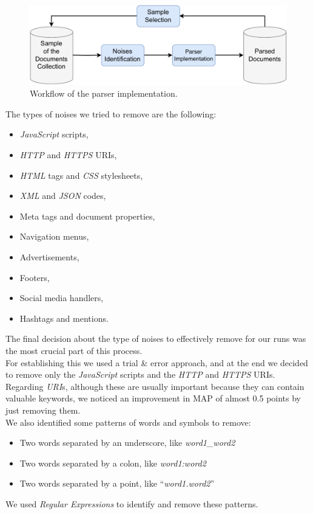 \begin{figure}[!h]
    \centering
    \includegraphics[width=0.8\linewidth]{figure/Parser_implementation_workflow.pdf}
    \caption{Workflow of the parser implementation.}
    \label{fig:Parser_implementation_workflow}
\end{figure}

The types of noises we tried to remove are the following:
\begin{itemize}
\item \textit{JavaScript} scripts,
\item \textit{HTTP} and \textit{HTTPS} URIs,
\item \textit{HTML} tags and \textit{CSS} stylesheets,
\item \textit{XML} and \textit{JSON} codes,
\item Meta tags and document properties,
\item Navigation menus,
\item Advertisements,
\item Footers,
\item Social media handlers,
\item Hashtags and mentions.
\end{itemize}
The final decision about the type of noises to effectively remove for our runs was the most crucial part of this process. \\
For establishing this we used a trial \& error approach, and at the end we decided to remove only the \textit{JavaScript} scripts and the \textit{HTTP} and \textit{HTTPS} URIs. Regarding \textit{URI}s, although these are usually important because they can contain valuable keywords, we noticed an improvement in \ac{MAP} of almost 0.5 points by just removing them. \\
We also identified some patterns of words and symbols to remove:
\begin{itemize}
\item Two words separated by an underscore, like \textit{word1\_word2}
\item Two words separated by a colon, like \textit{word1:word2}
\item Two words separated by a point, like ``\textit{word1.word2}''
\end{itemize}
We used \textit{Regular Expressions} \cite{regexdefinition} to identify and remove these patterns.  

